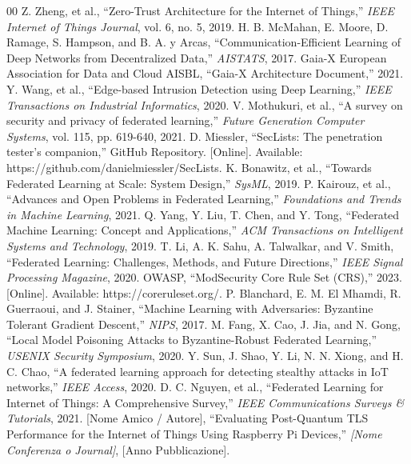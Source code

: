 \documentclass[conference]{IEEEtran}
\begin{document}
\begin{thebibliography}{00}
 Z. Zheng, et al., ``Zero-Trust Architecture for the Internet of Things,'' \textit{IEEE Internet of Things Journal}, vol. 6, no. 5, 2019.
 H. B. McMahan, E. Moore, D. Ramage, S. Hampson, and B. A. y Arcas, ``Communication-Efficient Learning of Deep Networks from Decentralized Data,'' \textit{AISTATS}, 2017.
 Gaia-X European Association for Data and Cloud AISBL, ``Gaia-X Architecture Document,'' 2021.
 Y. Wang, et al., ``Edge-based Intrusion Detection using Deep Learning,'' \textit{IEEE Transactions on Industrial Informatics}, 2020.
 V. Mothukuri, et al., ``A survey on security and privacy of federated learning,'' \textit{Future Generation Computer Systems}, vol. 115, pp. 619-640, 2021.
 D. Miessler, ``SecLists: The penetration tester's companion,'' GitHub Repository. [Online]. Available: https://github.com/danielmiessler/SecLists.
 K. Bonawitz, et al., ``Towards Federated Learning at Scale: System Design,'' \textit{SysML}, 2019.
 P. Kairouz, et al., ``Advances and Open Problems in Federated Learning,'' \textit{Foundations and Trends in Machine Learning}, 2021.
 Q. Yang, Y. Liu, T. Chen, and Y. Tong, ``Federated Machine Learning: Concept and Applications,'' \textit{ACM Transactions on Intelligent Systems and Technology}, 2019.
 T. Li, A. K. Sahu, A. Talwalkar, and V. Smith, ``Federated Learning: Challenges, Methods, and Future Directions,'' \textit{IEEE Signal Processing Magazine}, 2020.
 OWASP, ``ModSecurity Core Rule Set (CRS),'' 2023. [Online]. Available: https://coreruleset.org/.
 P. Blanchard, E. M. El Mhamdi, R. Guerraoui, and J. Stainer, ``Machine Learning with Adversaries: Byzantine Tolerant Gradient Descent,'' \textit{NIPS}, 2017.
 M. Fang, X. Cao, J. Jia, and N. Gong, ``Local Model Poisoning Attacks to Byzantine-Robust Federated Learning,'' \textit{USENIX Security Symposium}, 2020.
 Y. Sun, J. Shao, Y. Li, N. N. Xiong, and H. C. Chao, ``A federated learning approach for detecting stealthy attacks in IoT networks,'' \textit{IEEE Access}, 2020.
 D. C. Nguyen, et al., ``Federated Learning for Internet of Things: A Comprehensive Survey,'' \textit{IEEE Communications Surveys \& Tutorials}, 2021.
 [Nome Amico / Autore], ``Evaluating Post-Quantum TLS Performance for the Internet of Things Using Raspberry Pi Devices,'' \textit{[Nome Conferenza o Journal]}, [Anno Pubblicazione].
\end{thebibliography}
\end{document}
